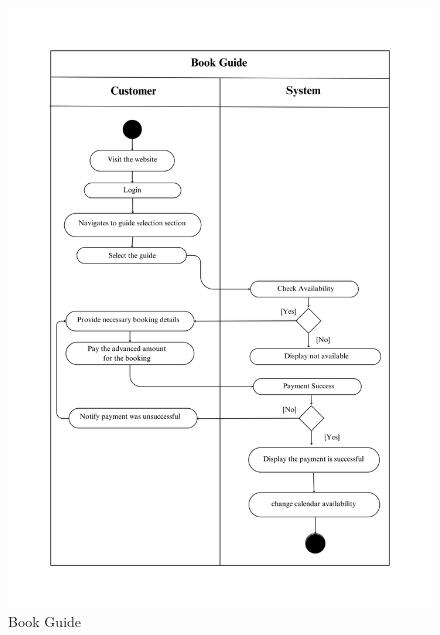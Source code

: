 \begin{figure}[h!]
    \centering
    \includegraphics[width=1\textwidth]{Images/Activity Diagrams/24 Book Guide.png}
    \caption{Book Guide}
    \label{fig:activity-book-guide}
\end{figure}

